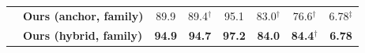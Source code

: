 \begin{table}[!t]
{\begin{tabular}{llcccccc}
    & \cellcolor{blue!8} \textbf{Ours (anchor, family)}
        & \cellcolor{blue!8} 89.9
        & \cellcolor{blue!8} 89.4$^{\dagger}$
        & \cellcolor{blue!8} 95.1
        & \cellcolor{blue!8} 83.0$^{\dagger}$
        & \cellcolor{blue!8} 76.6$^{\dagger}$
        & \cellcolor{blue!8} 6.78$^{\ddagger}$ \\
    & \cellcolor{blue!8} \textbf{Ours (hybrid, family)}
        & \cellcolor{blue!8} \textbf{94.9}
        & \cellcolor{blue!8} \textbf{94.7}
        & \cellcolor{blue!8} \textbf{97.2}
        & \cellcolor{blue!8} \textbf{84.0}
        & \cellcolor{blue!8} \textbf{84.4}$^{\dagger}$
        & \cellcolor{blue!8} \textbf{6.78} \\
    \bottomrule
    \end{tabular}}
\end{table}
